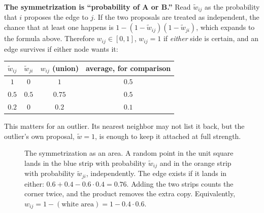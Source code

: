 \documentclass[11pt]{article}
\begin{document}
\begin{intuition}
\textbf{The symmetrization is ``probability of A or B.''} Read $\widetilde w_{ij}$ as the probability that $i$ proposes the edge to $j$. If the two proposals are treated as independent, the
chance that at least one happens is $1-(1-\widetilde w_{ij})(1-\widetilde w_{ji})$, which expands to the formula above. Therefore $w_{ij}\in[0,1]$, $w_{ij}=1$ if \emph{either} side is certain, and an edge
survives if either node wants it:
\begin{center}
\small
\renewcommand{\arraystretch}{1.2}
\begin{tabular}{cc|cc}
\toprule
$\widetilde w_{ij}$ & $\widetilde w_{ji}$ & $w_{ij}$ (union) & average, for comparison\\
\midrule
$1$ & $0$ & $1$ & $0.5$\\
$0.5$ & $0.5$ & $0.75$ & $0.5$\\
$0.2$ & $0$ & $0.2$ & $0.1$\\
\bottomrule
\end{tabular}
\end{center}
This matters for an outlier. Its nearest neighbor may not list it back, but the outlier's own proposal, $\widetilde w=1$, is enough to keep it attached at full strength.
\end{intuition}

\begin{figure}[htbp]
\centering
{}
\caption{The symmetrization as an area. A random point in the unit square lands in the blue strip with probability $\widetilde w_{ij}$ and in the orange strip with probability $\widetilde w_{ji}$, independently. The edge exists if it lands in either: $0.6+0.4-0.6\cdot0.4=0.76$. Adding the two strips counts the corner twice, and the product removes the extra copy. Equivalently, $w_{ij}=1-(\text{white area})=1-0.4\cdot0.6$.}
\label{fig:umapunion}
\end{figure}
\end{document}
